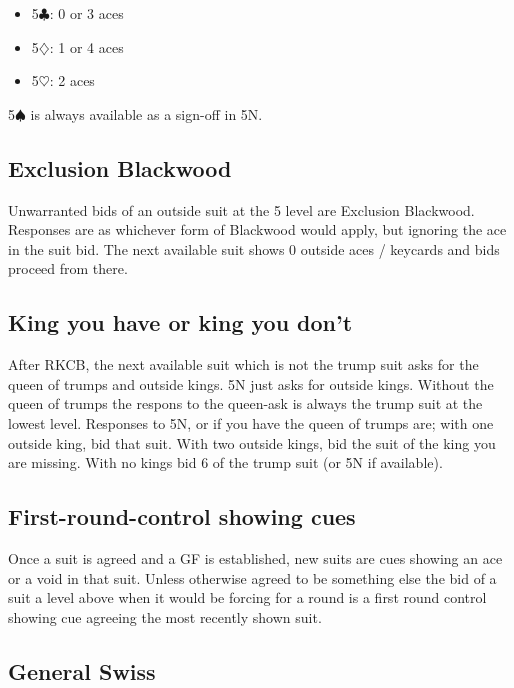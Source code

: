\documentclass[a4paper,14pt]{extarticle}
\begin{document}
\begin{itemize}
\item 5$\clubsuit$: 0 or 3 aces
\item 5$\diamondsuit$: 1 or 4 aces
\item 5$\heartsuit$: 2 aces
\end{itemize}

5$\spadesuit$ is always available as a sign-off in 5N.

\newpage

\subsection{Exclusion Blackwood}
\label{sec:exclusion}

Unwarranted bids of an outside suit at the 5 level are Exclusion Blackwood.
Responses are as whichever form of Blackwood would apply, but ignoring the ace
in the suit bid. The next available suit shows 0 outside aces / keycards and
bids proceed from there.


\subsection{King you have or king you don't}
\label{sec:kyhokyd}

After RKCB, the next available suit which is not the trump suit asks for the
queen of trumps and outside kings. 5N just asks for outside kings. Without the
queen of trumps the respons to the queen-ask is always the trump suit at the
lowest level. Responses to 5N, or if you have the queen of trumps are; with one
outside king, bid that suit. With two outside kings, bid the suit of the king
you are missing. With no kings bid 6 of the trump suit (or 5N if available).

\subsection{First-round-control showing cues}
\label{sec:cues}

Once a suit is agreed and a GF is established, new suits are cues showing an
ace or a void in that suit. Unless otherwise agreed to be something else the
bid of a suit a level above when it would be forcing for a round is a first round
control showing cue agreeing the most recently shown suit.

\newpage

\subsection{General Swiss}
\label{sec:swiss}
\label{note:19}
\end{document}
